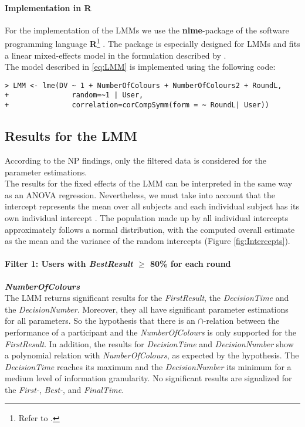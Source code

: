 \paragraph{Implementation in R}
For the implementation of the \ac{LMM}s we use the \textbf{nlme}-package of the software programming language \textbf{R}\footnote{Refer to \cite{R2012}.} . The package is especially designed for \ac{LMM}s  \citep{Pinheiro2013} and fits a linear mixed-effects model in the formulation described by \cite{Laird1982}.\\
The model described in \ref{eq:LMM} is implemented using the following code:
\begin{verbatim}
> LMM <- lme(DV ~ 1 + NumberOfColours + NumberOfColours2 + RoundL, 
+               random=~1 | User, 
+               correlation=corCompSymm(form = ~ RoundL| User))
\end{verbatim}

\subsection{Results for the \ac{LMM}}

According to the \acl{NP} findings, only the filtered data is considered for the parameter estimations.\\
The results for the fixed effects of the \ac{LMM} can be interpreted in the same way as an ANOVA regression. Nevertheless, we must take into account that the intercept represents the mean over all subjects and each individual subject has its own individual intercept \citep{Seltman2012}. The population made up by all individual intercepts approximately follows a normal distribution, with the computed overall estimate as the mean and the variance of the random intercepts (Figure \ref{fig:Intercepts}).

\paragraph{Filter 1: Users with \textit{BestResult} $\geq$ 80\% for each round}
\textbf{\textit{NumberOfColours} }\\
The \ac{LMM} returns significant results for the \textit{FirstResult}, the \textit{DecisionTime} and the \textit{DecisionNumber}.  Moreover, they all have significant parameter estimations for all parameters. So the hypothesis that there is an \textbf{$\cap$}-relation between the performance of a participant and the \textit{NumberOfColours} is only supported for the \textit{FirstResult}. In addition, the results for \textit{DecisionTime} and \textit{DecisionNumber} show a polynomial relation with \textit{NumberOfColours}, as expected by the hypothesis. The \textit{DecisionTime} reaches its maximum and the \textit{DecisionNumber} its minimum for a medium level of information granularity. No significant results are signalized for the \textit{First-}, \textit{Best-}, and \textit{FinalTime}.

